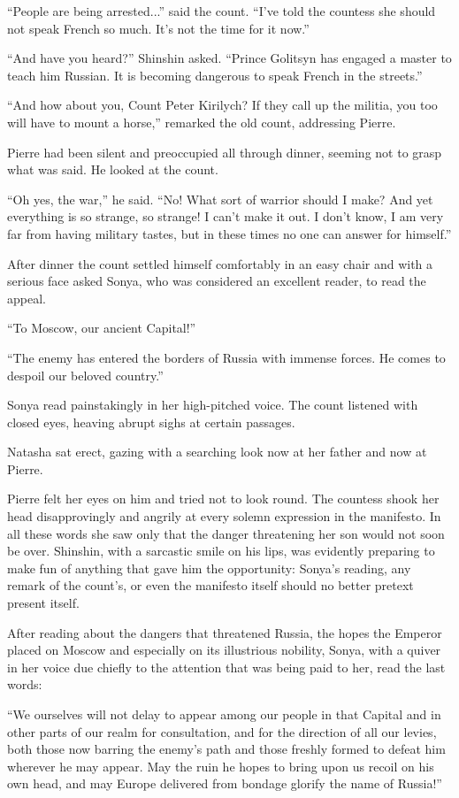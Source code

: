 ``People are being arrested...'' said the count. ``I've told the
countess she should not speak French so much. It's not the time
for it now.''

``And have you heard?'' Shinshin asked. ``Prince Golitsyn has
engaged a master to teach him Russian. It is becoming dangerous
to speak French in the streets.''

``And how about you, Count Peter Kirilych? If they call up the
militia, you too will have to mount a horse,'' remarked the old
count, addressing Pierre.

Pierre had been silent and preoccupied all through dinner,
seeming not to grasp what was said. He looked at the count.

``Oh yes, the war,'' he said. ``No! What sort of warrior should I
make? And yet everything is so strange, so strange! I can't make
it out. I don't know, I am very far from having military tastes,
but in these times no one can answer for himself.''

After dinner the count settled himself comfortably in an easy
chair and with a serious face asked Sonya, who was considered an
excellent reader, to read the appeal.

``To Moscow, our ancient Capital!''

``The enemy has entered the borders of Russia with immense
forces. He comes to despoil our beloved country.''

Sonya read painstakingly in her high-pitched voice. The count
listened with closed eyes, heaving abrupt sighs at certain
passages.

Natasha sat erect, gazing with a searching look now at her father
and now at Pierre.

Pierre felt her eyes on him and tried not to look round. The
countess shook her head disapprovingly and angrily at every
solemn expression in the manifesto. In all these words she saw
only that the danger threatening her son would not soon be
over. Shinshin, with a sarcastic smile on his lips, was evidently
preparing to make fun of anything that gave him the opportunity:
Sonya's reading, any remark of the count's, or even the manifesto
itself should no better pretext present itself.

After reading about the dangers that threatened Russia, the hopes
the Emperor placed on Moscow and especially on its illustrious
nobility, Sonya, with a quiver in her voice due chiefly to the
attention that was being paid to her, read the last words:

``We ourselves will not delay to appear among our people in that
Capital and in other parts of our realm for consultation, and for
the direction of all our levies, both those now barring the
enemy's path and those freshly formed to defeat him wherever he
may appear. May the ruin he hopes to bring upon us recoil on his
own head, and may Europe delivered from bondage glorify the name
of Russia!''

